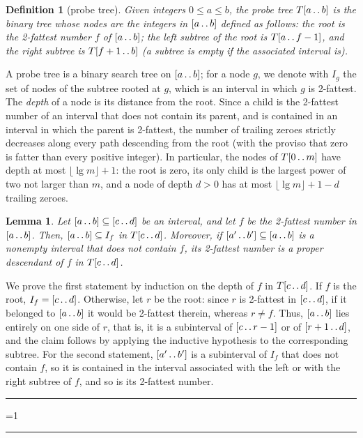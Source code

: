 \documentclass[a4paper]{article}
\newcounter{noqed}
\newcommand{\qed}{ \ifmmode\mbox{
}\fi\rule[-.05em]{.3em}{.7em}\setcounter{noqed}{0}}
\newenvironment{proof}[1][{}]{\noindent{\bf Proof#1.
}\setcounter{noqed}{1}}{\ifnum\value{noqed}=1\qed\fi\par\medskip}
\newtheorem{lemma}{Lemma}
\newtheorem{definition}{Definition}
\newcommand{\?}{\mskip1.5mu}
\def\..{\,\mathpunct{\ldotp\ldotp}} %
\begin{document}
\begin{definition}[probe tree]
\label{def:probetree}
Given integers $0\leq a\leq b$, the \emph{probe tree} $T[a\..b]$ is the binary tree whose nodes are the integers in $[a\..b]$ defined 
as follows: the root is the 2-fattest number $f$ of $[a\..b]$; the left subtree of the root is $T[a\..f-1]$, 
and the right subtree is $T[f+1\..b]$ (a subtree is empty if the associated interval is). 
\end{definition}

A probe tree is a binary search tree on $[a\..b]$; for a node $g$, we denote with $I_g$ the set of nodes of the subtree rooted at $g$, which 
is an interval in which $g$ is 2-fattest. The \emph{depth} of a node is its distance from the root.
Since a child is the 2-fattest number of an interval that does not contain its parent, and is contained in an interval in which the parent is 
2-fattest, the number of trailing zeroes strictly decreases along every path descending from the root (with the proviso that zero is fatter than every positive integer). 
In particular, the nodes of $T[0\..m]$ have depth at most $\lfloor\lg m\rfloor+1$: the root is zero, its only child is the largest power of two not larger than $m$, 
and a node of depth $d>0$ has at most $\lfloor\lg m\rfloor+1-d$ trailing zeroes. 

\begin{lemma}
\label{lemma:descent}
Let $[a\..b]\subseteq[c\..d]$ be an interval, and let $f$ be the 2-fattest number in $[a\..b]$. Then, $[a\..b]\subseteq I_f$ in $T[c\..d]$.
Moreover, if $[a'\..b']\subseteq[a\..b]$ is a nonempty interval that does not contain $f$, its 2-fattest number is a proper
descendant of $f$ in $T[c\..d]$.
\end{lemma}
\begin{proof}
We prove the first statement by induction on the depth of $f$ in $T[c\..d]$. If $f$ is the root, $I_f=[c\..d]$. 
Otherwise, let $r$ be the root: since $r$ is 2-fattest in $[c\..d]$, if it belonged to $[a\..b]$ it would be 2-fattest therein, 
whereas $r\neq f$. Thus, $[a\..b]$ lies entirely on one side of $r$, that is, it is a subinterval of $[c\..r-1]$ or of $[r+1\..d]$, 
and the claim follows by applying the inductive hypothesis to the corresponding subtree. For the second statement, 
$[a'\..b']$ is a subinterval of $I_f$ that does not contain $f$, so it is contained in the interval associated with the left or with the right subtree of $f$, 
and so is its 2-fattest number.\qed
\end{proof}
\end{document}
